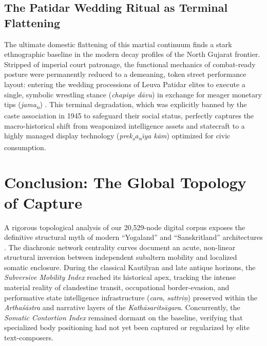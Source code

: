 \documentclass[11pt,twoside,letterpaper]{article}
\begin{document}
\subsection{The Patidar Wedding Ritual as Terminal Flattening}
The ultimate domestic flattening of this martial continuum finds a stark ethnographic baseline in the modern decay profiles of the North Gujarat frontier. Stripped of imperial court patronage, the functional mechanics of combat-ready posture were permanently reduced to a demeaning, token street performance layout: entering the wedding processions of Leuva Patidar elites to execute a single, symbolic wrestling stance (\textit{chapiye d\={a}vu}) in exchange for meager monetary tips (\textit{jama\textsubscript{n}}) \cite{Sandesara1948}. This terminal degradation, which was explicitly banned by the caste association in 1945 to safeguard their social status, perfectly captures the macro-historical shift from weaponized intelligence assets and statecraft to a highly managed display technology (\textit{prek\textsubscript{s}a\textsubscript{n}\={\i}ya k\={a}m}) optimized for civic consumption.


\section{Conclusion: The Global Topology of Capture}

A rigorous topological analysis of our 20,529-node digital corpus exposes the definitive structural myth of modern ``Yogaland'' and ``Sanskritland'' architectures \cite{McCartney2021, McCartney2026b}. The diachronic network centrality curves document an acute, non-linear structural inversion between independent subaltern mobility and localized somatic enclosure. During the classical Kautilyan and late antique horizons, the \textit{Subversive Mobility Index} reached its historical apex, tracking the intense material reality of clandestine transit, occupational border-evasion, and performative state intelligence infrastructure (\textit{cara}, \textit{sattriṇ}) preserved within the \textit{Arthaśāstra} and narrative layers of the \textit{Kathāsaritsāgara}. Concurrently, the \textit{Somatic Contortion Index} remained dormant on the baseline, verifying that specialized body positioning had not yet been captured or regularized by elite text-composers.
\end{document}
